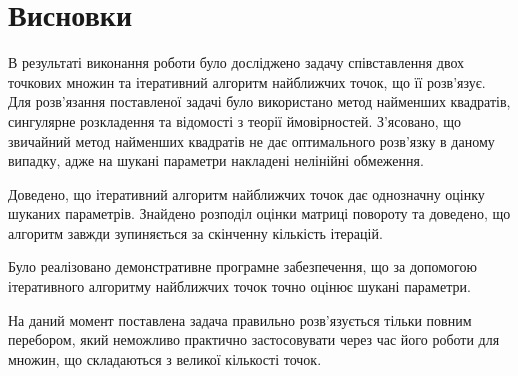 \chapter*{Висновки}

В результаті виконання роботи було досліджено задачу співставлення двох
точкових множин та ітеративний алгоритм найближчих точок, що її розв'язує.
Для розв'язання поставленої задачі було використано метод найменших квадратів,
сингулярне розкладення та відомості з теорії ймовірностей.
З'ясовано, що звичайний метод найменших квадратів не дає оптимального
розв'язку в даному випадку,
адже на шукані параметри накладені нелінійні обмеження.

Доведено, що ітеративний алгоритм найближчих точок дає однозначну оцінку шуканих
параметрів.
Знайдено розподіл оцінки матриці повороту та доведено,
що алгоритм завжди зупиняється за скінченну кількість ітерацій.

Було реалізовано демонстративне програмне забезпечення,
що за допомогою ітеративного алгоритму найближчих точок точно оцінює шукані
параметри.

На даний момент поставлена задача правильно розв'язується тільки повним
перебором, який неможливо практично застосовувати через час його
роботи для множин, що складаються з великої кількості точок.
